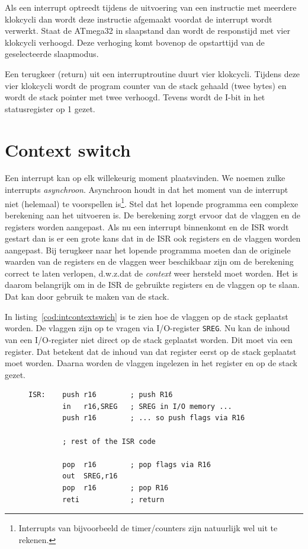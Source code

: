 Als een interrupt optreedt tijdens de uitvoering van een instructie met
meerdere klokcycli dan wordt deze instructie afgemaakt voordat de interrupt
wordt verwerkt. Staat de ATmega32 in slaapstand dan wordt de responstijd met
vier klokcycli verhoogd. Deze verhoging komt bovenop de opstarttijd van de
geselecteerde slaapmodus.

Een terugkeer (return) uit een interruptroutine duurt vier klokcycli. Tijdens
deze vier klokcycli wordt de program counter van de stack gehaald (twee bytes)
en wordt de stack pointer met twee verhoogd. Tevens wordt de I-bit in het
statusregister op 1 gezet.

\section{Context switch}
\label{sec:contextswitch}
Een interrupt kan op elk willekeurig moment plaatsvinden. We noemen zulke
interrupts \textsl{asynchroon}. Asynchroon houdt in dat het moment van
de interrupt niet (helemaal) te voorspellen is\footnote{Interrupts van
bijvoorbeeld de timer/counters zijn natuurlijk wel uit te rekenen.}. Stel
dat het lopende programma een complexe berekening aan het uitvoeren is.
De berekening zorgt ervoor dat de vlaggen en de registers worden aangepast.
Als nu een interrupt binnenkomt en de ISR wordt gestart dan is er een
grote kans dat in de ISR ook registers en de vlaggen worden aangepast.
Bij terugkeer naar het lopende programma moeten dan de originele waarden
van de registers en de vlaggen weer beschikbaar zijn om de berekening
correct te laten verlopen, d.w.z.\@ dat de \textsl{context} weer hersteld
moet worden. Het is daarom belangrijk om in de ISR de gebruikte registers
en de vlaggen op te slaan. Dat kan door gebruik te maken van de stack. 

In listing~\ref{cod:intcontextswich} is te zien hoe de vlaggen op de stack
geplaatst worden. De vlaggen zijn op te vragen via I/O-register
\lstinline|SREG|. Nu kan de inhoud van een I/O-register niet direct op de
stack geplaatst worden. Dit moet via een register. Dat betekent dat de inhoud
van dat register eerst op de stack geplaatst moet worden. Daarna worden de
vlaggen ingelezen in het register en op de stack gezet.

\begin{figure}[!ht]
\begin{lstlisting}[language=AVRassembler,caption=Opslaan van de registers en vlaggen.,label=cod:intcontextswich]
ISR:	push r16		; push R16
		in   r16,SREG	; SREG in I/O memory ...
		push r16		; ... so push flags via R16
		
		; rest of the ISR code

		pop  r16		; pop flags via R16
		out  SREG,r16
		pop  r16		; pop R16
		reti			; return
\end{lstlisting}
\end{figure}

